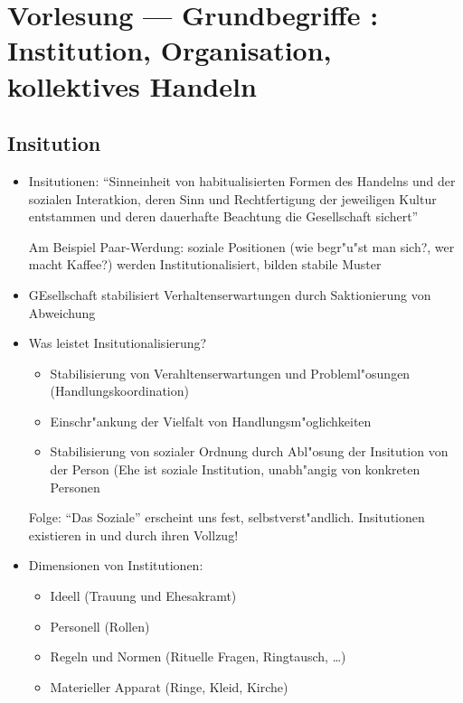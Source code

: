 
\section{Vorlesung  --- Grundbegriffe : Institution, Organisation, kollektives Handeln}
\subsection{Insitution}

\begin{itemize}
	\item
		Insitutionen: \enquote{Sinneinheit von habitualisierten Formen des Handelns und der sozialen Interatkion, deren Sinn und Rechtfertigung der jeweiligen Kultur entstammen und deren dauerhafte Beachtung die Gesellschaft sichert}

		 Am Beispiel Paar-Werdung: soziale Positionen (wie begr"u"st man sich?, wer macht Kaffee?) werden Institutionalisiert, bilden stabile Muster
	 \item
		 GEsellschaft stabilisiert Verhaltenserwartungen durch Saktionierung von Abweichung
	 \item
		 Was leistet Insitutionalisierung?
		 \begin{itemize}
			 \item
				 Stabilisierung von Verahltenserwartungen und Probleml"osungen (Handlungskoordination)
			 \item
				 Einschr"ankung der Vielfalt von Handlungsm"oglichkeiten
			 \item
				 Stabilisierung von sozialer Ordnung durch Abl"osung der Insitution von der Person (Ehe ist soziale Institution, unabh"angig von konkreten Personen
		 \end{itemize}
		 Folge: \enquote{Das Soziale} erscheint uns fest, selbstverst"andlich. Insitutionen existieren in und durch ihren Vollzug!

	 \item
		 Dimensionen von Institutionen:
		 \begin{itemize}
			 \item
				 Ideell (Trauung und Ehesakramt)
			 \item
				 Personell (Rollen)
			 \item
				 Regeln und Normen (Rituelle Fragen, Ringtausch, \dots)
			 \item
				 Materieller Apparat (Ringe, Kleid, Kirche)
		 \end{itemize}
\end{itemize}

